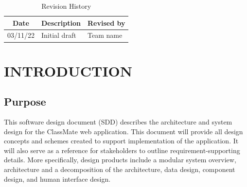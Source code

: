 \documentclass[letterpaper,12pt,oneside,listof=totoc]{scrreprt}
\begin{document}
\begin{table}[hbt!]
\begin{tabular}{| c | p{} | p{} |}
\hline
Date     & Description   & Revised by \\
\hline
03/11/22 & Initial draft & Team name \\
\hline
\end{tabular}
\caption{Revision History}
\label{tab:Revision History}
\end{table}
%
%
%

\chapter{INTRODUCTION}

\section{Purpose}

This software design document (SDD) describes the architecture and system design for the ClassMate web application. This document will provide all design concepts and schemes created to support implementation of the application. It will also serve as a reference for stakeholders to outline requirement-supporting details. More specifically, design products include a modular system overview, architecture and a decomposition of the architecture, data design, component design, and human interface design. 
\end{document}

